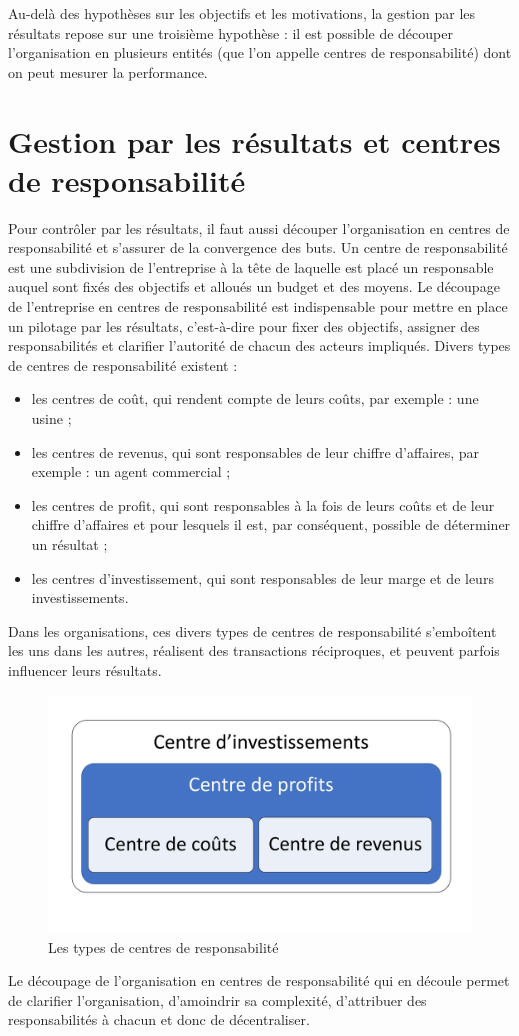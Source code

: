 \documentclass[oneside]{kaobook}
\begin{document}
Au-delà des hypothèses sur les objectifs et les motivations, la gestion par les résultats repose sur une troisième hypothèse : il est possible de découper l'organisation en plusieurs entités (que l'on appelle centres de responsabilité) dont on peut mesurer la performance.

\section{Gestion par les résultats et centres de responsabilité}
\label{sec:org2ed3195}
Pour contrôler par les résultats, il faut aussi découper l’organisation en centres de responsabilité et s’assurer de la convergence des buts. 
Un centre de responsabilité est une subdivision de l’entreprise à la tête de laquelle est placé un responsable auquel sont fixés des objectifs et alloués un budget et des moyens. Le découpage de l’entreprise en centres de responsabilité est indispensable pour mettre en place un pilotage par les résultats, c’est-à-dire pour fixer des objectifs, assigner des responsabilités et clarifier l’autorité de chacun des acteurs impliqués. Divers types de centres de responsabilité existent : 
\begin{itemize}
\item les centres de coût, qui rendent compte de leurs coûts, par exemple : une usine ;
\item les centres de revenus, qui sont responsables de leur chiffre d’affaires, par exemple : un agent commercial ;
\item les centres de profit, qui sont responsables à la fois de leurs coûts et de leur chiffre d’affaires et pour lesquels il est, par conséquent, possible de déterminer un résultat ;
\item les centres d’investissement, qui sont responsables de leur marge et de leurs investissements.
\end{itemize}
Dans les organisations, ces divers types de centres de responsabilité s’emboîtent les uns dans les autres, réalisent des transactions réciproques, et peuvent parfois influencer leurs résultats.

\begin{figure}[H]

\includegraphics{./img/centres.pdf}
\caption{Les types de centres de responsabilité}
\end{figure}
Le découpage de l’organisation en centres de responsabilité qui en découle permet de clarifier l’organisation, d’amoindrir sa complexité, d’attribuer des responsabilités à chacun et donc de décentraliser.
\end{document}
